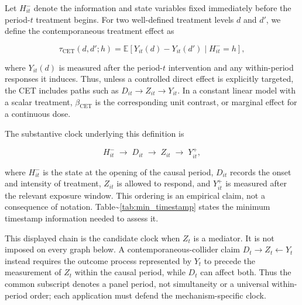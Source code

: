 \documentclass[
]{article}
\begin{document}
Let \(H_{it}^{-}\) denote the information and state variables fixed
immediately before the period-\(t\) treatment begins. For two
well-defined treatment levels \(d\) and \(d'\), we define the
contemporaneous treatment effect as

\[
\tau_{\mathrm{CET}}(d,d';h)
=
\mathbb{E}\!\left[Y_{it}(d)-Y_{it}(d')\mid H_{it}^{-}=h\right],
\]

where \(Y_{it}(d)\) is measured after the period-\(t\) intervention and
any within-period responses it induces. Thus, unless a controlled direct
effect is explicitly targeted, the CET includes paths such as
\(D_{it}\rightarrow Z_{it}\rightarrow Y_{it}\). In a constant linear
model with a scalar treatment, \(\beta_{\mathrm{CET}}\) is the
corresponding unit contrast, or marginal effect for a continuous dose.

The substantive clock underlying this definition is

\[
H_{it}^{-}
\;\longrightarrow\;
D_{it}
\;\longrightarrow\;
Z_{it}
\;\longrightarrow\;
Y_{it}^{+},
\]

where \(H_{it}^{-}\) is the state at the opening of the causal period,
\(D_{it}\) records the onset and intensity of treatment, \(Z_{it}\) is
allowed to respond, and \(Y_{it}^{+}\) is measured after the relevant
exposure window. This ordering is an empirical claim, not a consequence
of notation. Table\textasciitilde{}\ref{tab:min_timestamp} states the
minimum timestamp information needed to assess it.

This displayed chain is the candidate clock when \(Z_t\) is a mediator.
It is not imposed on every graph below. A contemporaneous-collider claim
\(D_t\rightarrow Z_t\leftarrow Y_t\) instead requires the outcome
process represented by \(Y_t\) to precede the measurement of \(Z_t\)
within the causal period, while \(D_t\) can affect both. Thus the common
subscript denotes a panel period, not simultaneity or a universal
within-period order; each application must defend the mechanism-specific
clock.
\end{document}
